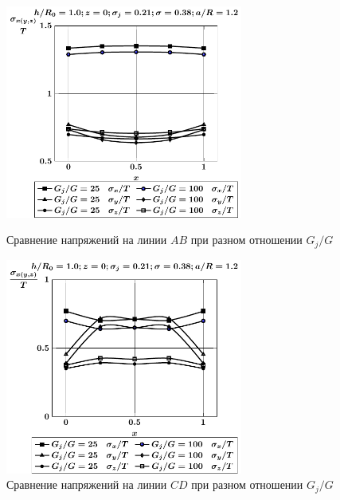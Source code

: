 \begin{figure}[h!]
\centering\footnotesize
\parbox[b]{7.5cm}{\centering\includegraphics[width=7.8cm]{inc24-g-a12-h10-r10-z0.pdf}
\caption{Сравнение напряжений на линии $AB$ при разном отношении $G_j/G$
\label{f:7:114}}}\hfil\hfil
\parbox[b]{7.5cm}{\centering\includegraphics[width=7.8cm]{inc24-g-a12-h10-r10-z0-diag.pdf}
\caption{Сравнение напряжений на линии $CD$ при разном отношении $G_j/G$
\label{f:7:115}}}
\end{figure}

